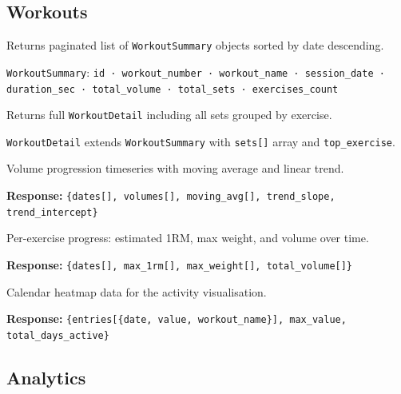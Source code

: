 \documentclass[12pt,a4paper]{report}
\begin{document}
\subsection{Workouts}

\begin{apibox}[GET /api/workouts/users/\{user\_id\}?limit=50]
Returns paginated list of \texttt{WorkoutSummary} objects sorted by date descending.

\texttt{WorkoutSummary}: \texttt{id · workout\_number · workout\_name · session\_date · duration\_sec · total\_volume · total\_sets · exercises\_count}
\end{apibox}

\begin{apibox}
Returns full \texttt{WorkoutDetail} including all sets grouped by exercise.

\texttt{WorkoutDetail} extends \texttt{WorkoutSummary} with \texttt{sets[]} array and \texttt{top\_exercise}.
\end{apibox}

\begin{apibox}
Volume progression timeseries with moving average and linear trend.

\textbf{Response:} \texttt{\{dates[], volumes[], moving\_avg[], trend\_slope, trend\_intercept\}}
\end{apibox}

\begin{apibox}
Per-exercise progress: estimated 1RM, max weight, and volume over time.

\textbf{Response:} \texttt{\{dates[], max\_1rm[], max\_weight[], total\_volume[]\}}
\end{apibox}

\begin{apibox}
Calendar heatmap data for the activity visualisation.

\textbf{Response:} \texttt{\{entries[\{date, value, workout\_name\}], max\_value, total\_days\_active\}}
\end{apibox}

\subsection{Analytics}
\end{document}
